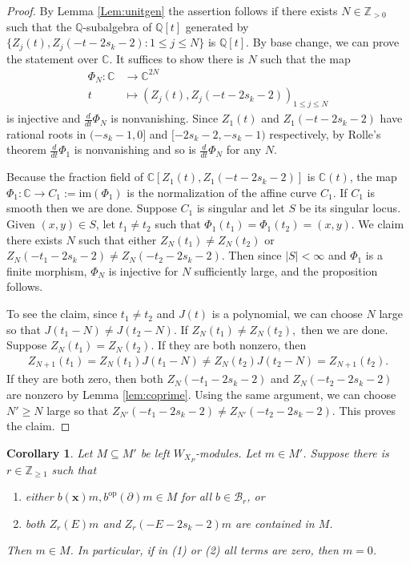 \documentclass[11pt,a4paper,usenames,dvipsnames,reqno]{amsart}
\numberwithin{equation}{section}
\newcommand{\cc}{\mathbb C}
\newcommand{\zz}{\mathbb Z}
\newcommand{\qq}{\mathbb Q}
\newtheorem{Cor}[Thm]{Corollary}
\theoremstyle{definition}
\theoremstyle{remark}
\begin{document}
\begin{proof}
By Lemma \ref{Lem:unitgen} the assertion follows if  there exists $N\in \zz_{>0}$ such that the $\qq$-subalgebra of $\qq[t]$ generated by $\{Z_{j}(t), Z_j(-t-2s_k-2): 1\le j\le N\}$  is $\qq[t]$. By base change, we can prove the statement over $\cc$. It suffices to show there is $N$ such that the map 
\begin{align*}
    \Phi_N: \cc&\to \cc^{2N}\\
    t&\mapsto (Z_j(t), Z_j(-t-2s_k-2))_{1\le j\le N}
\end{align*}
is injective and $\frac{d}{dt}\Phi_N$ is nonvanishing. Since $Z_1(t)$ and $Z_1(-t-2s_k-2)$ have rational roots in $(-s_k-1,0]$ and $[-2s_k-2,-s_k-1)$ respectively, by Rolle's theorem $\frac{d}{dt}\Phi_1$ is nonvanishing and so is $\frac{d}{dt}\Phi_N$ for any $N$.

Because the fraction field of $\cc[Z_1(t), Z_1(-t-2s_k-2)]$ is $\cc(t)$, the map $\Phi_1:\cc\to C_1:=\mathrm{im}(\Phi_1)$ is the normalization of the affine curve $C_1$. If $C_1$ is smooth then we are done. Suppose $C_1$ is singular and let  $S$ be its singular locus. Given $(x,y)\in S$, let $t_1\neq t_2$ such that $\Phi_1(t_1)=\Phi_1(t_2)=(x,y)$. We claim there exists $N$ such that either $Z_{N}(t_1)\neq Z_N(t_2)$ or $Z_{N}(-t_1-2s_k-2)\neq Z_{N}(-t_2-2s_k-2)$. Then since $|S|<\infty$ and $\Phi_1$ is a finite morphism, $\Phi_N$ is injective for $N$ sufficiently large, and the proposition follows.

To see the claim, since $t_1\neq t_2$ and $J(t)$ is a polynomial, we can choose $N$ large so that $J(t_1-N)\neq J(t_2-N).$ If $Z_{N}(t_1)\neq Z_{N}(t_2),$ then we are done. Suppose $Z_{N}(t_1)= Z_{N}(t_2)$. If they are both nonzero, then
\begin{align*}
    Z_{N+1}(t_1)=Z_{N}(t_1)J(t_1-N)\neq Z_{N}(t_2)J(t_2-N)=Z_{N+1}(t_2).
\end{align*}
If they are both zero, then both $Z_N(-t_1-2s_k-2)$ and $Z_{N}(-t_2-2s_k-2)$ are nonzero by Lemma \ref{lem:coprime}. Using the same argument, we can choose $N'\ge N$ large so that $Z_{N'}(-t_1-2s_k-2)\neq Z_{N'}(-t_2-2s_k-2)$. This proves the claim.
\end{proof}

\begin{Cor}\label{cor:critical}
    Let $M\subseteq M'$ be left $W_{X_P}$-modules. Let $m\in M'$. Suppose there is $r\in \zz_{\ge 1}$ such that 
    \begin{enumerate}
        \item either $b(\mathbf{x})m, b^{\mathrm{op}}(\partial)m\in M$  for all $b\in \mathcal{B}_r$, or
        \item both $Z_r(E)m$ and $Z_r(-E-2s_k-2)m$ are contained in $M$.
    \end{enumerate}
    Then $m\in M$. In particular, if in (1) or (2) all terms are zero, then $m=0$.
\end{Cor}
\end{document}
